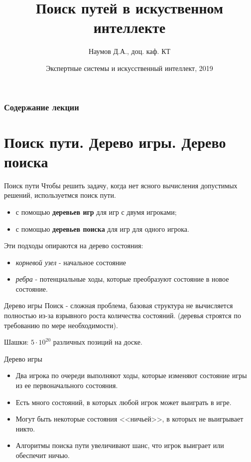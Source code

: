 \documentclass{beamer}
\title[Artifical Intelligence]{Поиск путей в искуственном интеллекте}
\author{Наумов Д.А., доц. каф. КТ}
\date[08.10.2019] {Экспертные системы и искусственный интеллект, 2019}
\begin{document}
\begin{frame}
  \titlepage
\end{frame}
  
\begin{frame}
  \frametitle{Содержание лекции}
  \tableofcontents  
\end{frame}

\section{Поиск пути. Дерево игры. Дерево поиска}

\begin{frame}{Поиск пути}
Чтобы решить задачу, когда нет ясного вычисления допустимых решений, используетмся поиск пути.
\begin{itemize}
\item с помощью \textbf{деревьев игр} для игр с двумя игроками;
\item с помощью \textbf{деревьев поиска} для игр для одного игрока.
\end{itemize}
Эти подходы опираются на дерево состояния:
\begin{itemize}
\item \textit{корневой узел} - начальное состояние
\item \textit{ребра} - потенциальные ходы, которые преобразуют состояние в новое состояние. 
\end{itemize}
\end{frame}

\begin{frame}{Дерево игры}
Поиск  - сложная проблема, базовая структура не вычисляется полностью из-за взрывного роста количества состояний.
(деревья строятся по требованию по мере необходимости).

Шашки: $5\cdot10^{20}$ различных позиций на доске. 
\begin{block}{Дерево игры}
\begin{itemize}
\item Два игрока по очереди выполняют ходы, которые изменяют состояние игры из ее первоначального состояния. 
\item Есть много состояний, в которых любой игрок может выиграть в игре. 
\item Могут быть некоторые состояния <<ничьей>>, в которых не выигрывает никто. 
\item Алгоритмы поиска пути увеличивают шанс, что игрок выиграет или обеспечит ничью.
\end{itemize}
\end{block}
\end{frame}
\end{document}
